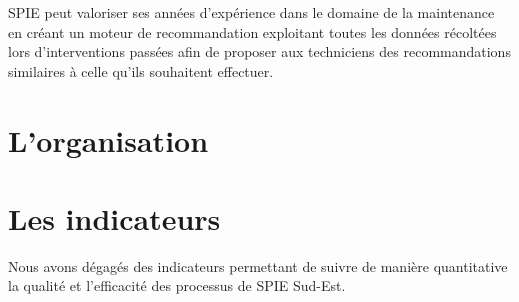         SPIE peut valoriser ses années d'expérience dans le domaine de la maintenance en créant un moteur de recommandation exploitant toutes les données récoltées lors d'interventions passées afin de proposer aux techniciens des recommandations similaires à celle qu'ils souhaitent effectuer.

\section{L'organisation}

\section{Les indicateurs}

    Nous avons dégagés des indicateurs permettant de suivre de manière quantitative la qualité et l'efficacité des processus de SPIE Sud-Est.

